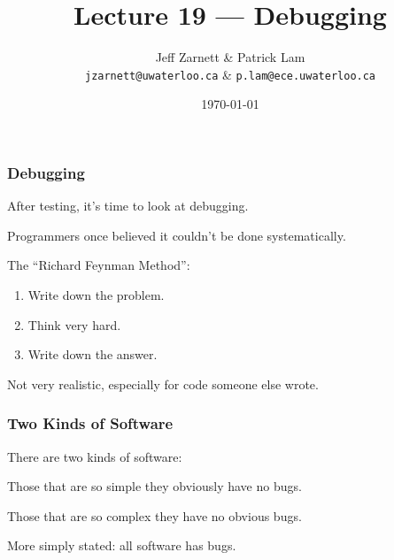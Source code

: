 
\usepackage{alltt}

\title{Lecture 19 --- Debugging}

\author{Jeff Zarnett \& Patrick Lam \\ \small \texttt{jzarnett@uwaterloo.ca} \& \texttt{p.lam@ece.uwaterloo.ca}}
\date{\today}



\begin{frame}
  \titlepage


\end{frame}

\begin{frame}
\frametitle{Debugging}
\begin{changemargin}{1cm}
After testing, it's time to look at debugging. 

Programmers once believed it couldn't be done systematically.

The ``Richard Feynman Method'':
\begin{enumerate}
	\item Write down the problem.
	\item Think very hard.
	\item Write down the answer.
\end{enumerate}

Not very realistic, especially for code someone else wrote.


\end{changemargin}
\end{frame}


\begin{frame}
\frametitle{Two Kinds of Software}
\begin{changemargin}{1cm}
There are two kinds of software:

Those that are so simple they obviously have no bugs.

Those that are so complex they have no obvious bugs.


More simply stated: all software has bugs.

\end{changemargin}
\end{frame}

